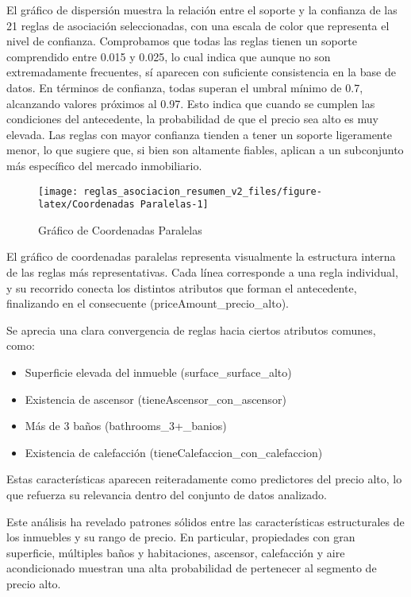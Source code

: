 \documentclass[
]{article}
\begin{document}
El gráfico de dispersión muestra la relación entre el soporte y la
confianza de las 21 reglas de asociación seleccionadas, con una escala
de color que representa el nivel de confianza. Comprobamos que todas las
reglas tienen un soporte comprendido entre 0.015 y 0.025, lo cual indica
que aunque no son extremadamente frecuentes, sí aparecen con suficiente
consistencia en la base de datos. En términos de confianza, todas
superan el umbral mínimo de 0.7, alcanzando valores próximos al 0.97.
Esto indica que cuando se cumplen las condiciones del antecedente, la
probabilidad de que el precio sea alto es muy elevada. Las reglas con
mayor confianza tienden a tener un soporte ligeramente menor, lo que
sugiere que, si bien son altamente fiables, aplican a un subconjunto más
específico del mercado inmobiliario.

\begin{figure}[H]

{\centering \texttt{[image: reglas\_asociacion\_resumen\_v2\_files/figure-latex/Coordenadas Paralelas-1]} 

}

\caption{Gráfico de Coordenadas Paralelas}\label{fig:Coordenadas Paralelas}
\end{figure}

El gráfico de coordenadas paralelas representa visualmente la estructura
interna de las reglas más representativas. Cada línea corresponde a una
regla individual, y su recorrido conecta los distintos atributos que
forman el antecedente, finalizando en el consecuente
(priceAmount\_precio\_alto).

Se aprecia una clara convergencia de reglas hacia ciertos atributos
comunes, como:

\begin{itemize}
\item
  Superficie elevada del inmueble (surface\_surface\_alto)
\item
  Existencia de ascensor (tieneAscensor\_con\_ascensor)
\item
  Más de 3 baños (bathrooms\_3+\_banios)
\item
  Existencia de calefacción (tieneCalefaccion\_con\_calefaccion)
\end{itemize}

Estas características aparecen reiteradamente como predictores del
precio alto, lo que refuerza su relevancia dentro del conjunto de datos
analizado.

Este análisis ha revelado patrones sólidos entre las características
estructurales de los inmuebles y su rango de precio. En particular,
propiedades con gran superficie, múltiples baños y habitaciones,
ascensor, calefacción y aire acondicionado muestran una alta
probabilidad de pertenecer al segmento de precio alto.
\end{document}

